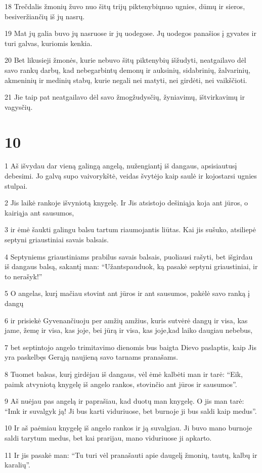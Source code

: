 \par 18 Trečdalis žmonių žuvo nuo šitų trijų piktenybių­nuo ugnies, dūmų ir sieros, besiveržiančių iš jų nasrų. 
\par 19 Mat jų galia buvo jų nasruose ir jų uodegose. Jų uodegos panašios į gyvates ir turi galvas, kuriomis kenkia. 
\par 20 Bet likusieji žmonės, kurie nebuvo šitų piktenybių išžudyti, neatgailavo dėl savo rankų darbų, kad nebegarbintų demonų ir auksinių, sidabrinių, žalvarinių, akmeninių ir medinių stabų, kurie negali nei matyti, nei girdėti, nei vaikščioti. 
\par 21 Jie taip pat neatgailavo dėl savo žmogžudysčių, žyniavimų, ištvirkavimų ir vagysčių.


\chapter{10}


\par 1 Aš išvydau dar vieną galingą angelą, nužengiantį iš dangaus, apsisiautusį debesimi. Jo galvą supo vaivorykštė, veidas švytėjo kaip saulė ir kojos­tarsi ugnies stulpai. 
\par 2 Jis laikė rankoje išvyniotą knygelę. Ir Jis atsistojo dešiniąja koja ant jūros, o kairiąja ant sausumos, 
\par 3 ir ėmė šaukti galingu balsu tartum riaumojantis liūtas. Kai jis sušuko, atsiliepė septyni griaustiniai savais balsais. 
\par 4 Septyniems griaustiniams prabilus savais balsais, puoliausi rašyti, bet išgirdau iš dangaus balsą, sakantį man: “Užantspauduok, ką pasakė septyni griaustiniai, ir to nerašyk!” 
\par 5 O angelas, kurį mačiau stovint ant jūros ir ant sausumos, pakėlė savo ranką į dangų 
\par 6 ir prisiekė Gyvenančiuoju per amžių amžius, kuris sutvėrė dangų ir visa, kas jame, žemę ir visa, kas joje, bei jūrą ir visa, kas joje,­kad laiko daugiau nebebus, 
\par 7 bet septintojo angelo trimitavimo dienomis bus baigta Dievo paslaptis, kaip Jis yra paskelbęs Gerąją naujieną savo tarnams pranašams. 
\par 8 Tuomet balsas, kurį girdėjau iš dangaus, vėl ėmė kalbėti man ir tarė: “Eik, paimk atvyniotą knygelę iš angelo rankos, stovinčio ant jūros ir sausumos”. 
\par 9 Aš nuėjau pas angelą ir paprašiau, kad duotų man knygelę. O jis man tarė: “Imk ir suvalgyk ją! Ji bus karti viduriuose, bet burnoje ji bus saldi kaip medus”. 
\par 10 Ir aš paėmiau knygelę iš angelo rankos ir ją suvalgiau. Ji buvo mano burnoje saldi tarytum medus, bet kai prarijau, mano viduriuose ji apkarto. 
\par 11 Ir jis pasakė man: “Tu turi vėl pranašauti apie daugelį žmonių, tautų, kalbų ir karalių”.


